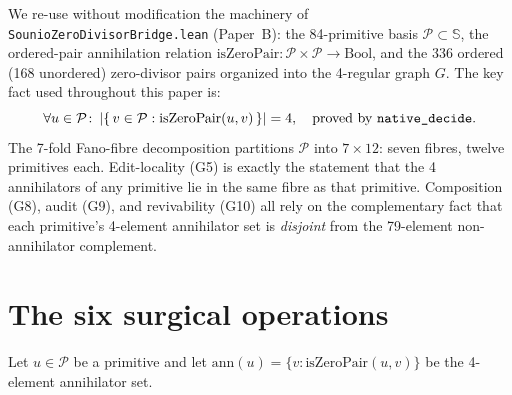 \documentclass{article}
\newcommand{\sio}{\mathbb{S}}
\begin{document}
We re-use without modification the machinery of
\texttt{SounioZeroDivisorBridge.lean} (Paper~B): the 84-primitive basis
$\mathcal{P} \subset \sio$, the ordered-pair annihilation relation
$\mathrm{isZeroPair} : \mathcal{P} \times \mathcal{P} \to \mathrm{Bool}$,
and the 336 ordered (168 unordered) zero-divisor pairs organized into
the 4-regular graph $G$.  The key fact used throughout this paper is:
\[
  \forall u \in \mathcal{P} \colon
  \left|\{\,v \in \mathcal{P} : \mathrm{isZeroPair}(u, v)\,\}\right| = 4,
  \quad \text{proved by \texttt{native\_decide}.}
\]
The 7-fold Fano-fibre decomposition partitions $\mathcal{P}$ into
$7 \times 12$: seven fibres, twelve primitives each.  Edit-locality
(G5) is exactly the statement that the 4 annihilators of any primitive
lie in the same fibre as that primitive.  Composition (G8), audit
(G9), and revivability (G10) all rely on the complementary fact that
each primitive's 4-element annihilator set is \emph{disjoint} from
the 79-element non-annihilator complement.

\section{The six surgical operations}

Let $u \in \mathcal{P}$ be a primitive and let $\mathrm{ann}(u) =
\{v : \mathrm{isZeroPair}(u,v)\}$ be the 4-element annihilator set.
\end{document}
